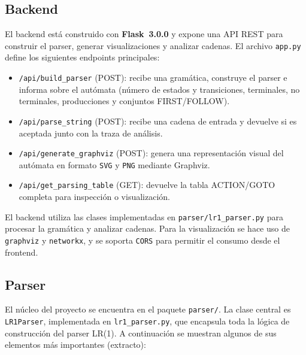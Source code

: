 \documentclass[12pt,a4paper]{article}
\begin{document}
\subsection{Backend}

El backend está construido con \textbf{Flask~3.0.0} y expone una API REST para construir el parser, generar visualizaciones y analizar cadenas.  El archivo \texttt{app.py} define los siguientes endpoints principales:
\begin{itemize}
  \item \texttt{/api/build\_parser} (POST): recibe una gramática, construye el parser e informa sobre el autómata (número de estados y transiciones, terminales, no terminales, producciones y conjuntos FIRST/FOLLOW).
  \item \texttt{/api/parse\_string} (POST): recibe una cadena de entrada y devuelve si es aceptada junto con la traza de análisis.
  \item \texttt{/api/generate\_graphviz} (POST): genera una representación visual del autómata en formato \texttt{SVG} y \texttt{PNG} mediante Graphviz.
  \item \texttt{/api/get\_parsing\_table} (GET): devuelve la tabla ACTION/GOTO completa para inspección o visualización.
\end{itemize}
El backend utiliza las clases implementadas en \texttt{parser/lr1\_parser.py} para procesar la gramática y analizar cadenas.  Para la visualización se hace uso de \texttt{graphviz} y \texttt{networkx}, y se soporta \texttt{CORS} para permitir el consumo desde el frontend.

\subsection{Parser}

El núcleo del proyecto se encuentra en el paquete \texttt{parser/}.  La clase central es \texttt{LR1Parser}, implementada en \texttt{lr1\_parser.py}, que encapsula toda la lógica de construcción del parser LR(1).  A continuación se muestran algunos de sus elementos más importantes (extracto):
\end{document}
